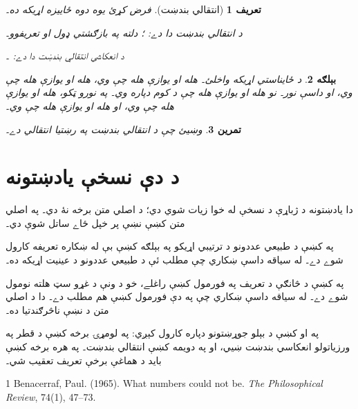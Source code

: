 \documentclass[12pt,a4paper,oneside]{report}
\newcommand{\Nat}{\mathbb{N}}
\newcommand{\Int}{\mathbb{Z}}
\newcommand{\Id}[1]{\mathord{\mathrm{Id}_{#1}}}
\newtheorem{defn}{تعريف}[section]
\newtheorem{ex}[defn]{بېلګه}
\newtheorem{prob}[defn]{تمرين}
\begin{document}
\begin{defn}[انتقالي بندښت]فرض کړئ  يوه دوه ځاييزه اړيکه ده۔

د  \emph{انتقالي بندښت} دا دے:
\LR{$R^+ = \bigcup_{0 < n \in \Nat} R^n$}؛ دلته په بازګشتي ډول
 او  تعريفوو۔

د  \emph{انعکاسي انتقالي بندښت} دا دے:
\LR{$R^* = R^+ \cup \Id{A}$}۔
\end{defn}

\begin{ex}
د ځايناستي اړيکه \LR{$S \subseteq \Int^2$} واخلئ۔  هله او
يوازې هله چې  وي،  هله او يوازې هله چې
 وي، او داسې نور۔ نو  هله او يوازې هله چې
د کوم  دپاره  وي۔ په نورو ټکو، 
هله او يوازې هله چې  وي، او  هله او يوازې هله چې
 وي۔
\end{ex}

\begin{prob}
وښيئ چې د  انتقالي بندښت په رښتيا انتقالي دے۔
\end{prob}



\chapter*{د دې نسخې يادښتونه}
دا يادښتونه د ژباړې د نسخې له خوا زيات شوي دي؛ د اصلي متن برخه نۀ
دي۔ په اصلي متن کښې نښې پر خپل ځاے ساتل شوې دي۔

په  کښې د طبيعي عددونو د ترتيبي اړيکو په
بېلګه کښې  بې له ښکاره تعريفه کارول شوے دے۔ له سياقه داسې
ښکاري چې مطلب ئې د طبيعي عددونو د عينيت اړيکه ده۔

په  کښې د څانګې د تعريف په فورمول کښې
 راغلے، خو د ونې د غړو سټ هلته  نومول شوے دے۔ له سياقه
داسې ښکاري چې په دې فورمول کښې هم مطلب  دے۔ دا د اصلي متن د
نښې ناڅرګندتيا ده۔

په  او  کښې
 د بېلو جوړښتونو دپاره کارول کېږي: په لومړۍ برخه کښې د قطر
په ورزياتولو انعکاسي بندښت ښيي، او په دويمه کښې انتقالي بندښت۔
په هره برخه کښې بايد د هماغې برخې تعريف تعقيب شي۔

\clearpage
\begin{LTR}\latinfont
\begin{thebibliography}{1}
Benacerraf, Paul. (1965). What numbers could not be. \emph{The Philosophical Review}, 74(1), 47--73.
\end{thebibliography}
\end{LTR}
\end{document}
